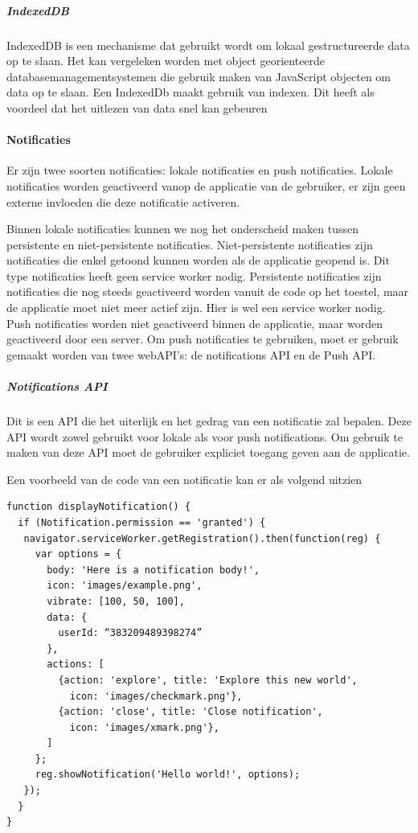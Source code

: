 			\subparagraph{IndexedDB}

				IndexedDB is een mechanisme dat gebruikt wordt om lokaal gestructureerde data op te slaan. Het kan vergeleken worden met object georienteerde databasemanagementsystemen die gebruik maken van JavaScript objecten om data op te slaan. Een IndexedDb maakt gebruik van indexen. Dit heeft als voordeel dat het uitlezen van data snel kan gebeuren
				\autocite{Mozilla2019}
	
	
	\paragraph{Notificaties}
	
		Er zijn twee soorten notificaties: lokale notificaties en push notificaties. 
		Lokale notificaties worden geactiveerd vanop de applicatie van de gebruiker, er zijn geen externe invloeden die deze notificatie activeren.
		
		Binnen lokale notificaties kunnen we nog het onderscheid maken tussen persistente en niet-persistente notificaties.
		Niet-persistente notificaties zijn notificaties die enkel getoond kunnen worden als de applicatie geopend is. Dit type notificaties heeft geen service worker nodig. 
		Persistente notificaties zijn notificaties die nog steeds geactiveerd worden vanuit de code op het toestel, maar de applicatie moet niet meer actief zijn. Hier is wel een service worker nodig.
		{\tiny }
		Push notificaties worden niet geactiveerd binnen de applicatie, maar worden geactiveerd door een server.
		Om push notificaties te gebruiken, moet er gebruik gemaakt worden van twee webAPI’s: de notifications API en de Push API.
		
		\subparagraph{Notifications API}
			Dit is een API die het uiterlijk en het gedrag van een notificatie zal bepalen. Deze API wordt zowel gebruikt voor lokale als voor push notifications.
			Om gebruik te maken van deze API moet de gebruiker expliciet toegang geven aan de applicatie.
			
			Een voorbeeld van de code van een notificatie kan er als volgend uitzien
		
	
		
\begin{lstlisting}
function displayNotification() {
  if (Notification.permission == 'granted') {
   navigator.serviceWorker.getRegistration().then(function(reg) {
     var options = {
       body: 'Here is a notification body!',
       icon: 'images/example.png',
       vibrate: [100, 50, 100],
       data: {
         userId: “383209489398274”
       },
       actions: [
         {action: 'explore', title: 'Explore this new world',
           icon: 'images/checkmark.png'},
         {action: 'close', title: 'Close notification',
           icon: 'images/xmark.png'},
       ]
     };
     reg.showNotification('Hello world!', options);
   });
  }
}
\end{lstlisting}
		

